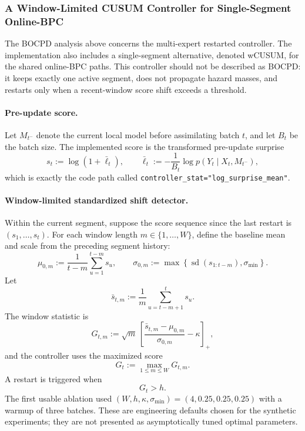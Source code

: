 \documentclass{article}
\begin{document}
\subsubsection{A Window-Limited CUSUM Controller for Single-Segment Online-BPC}
\label{sec:wcusum_controller}

The BOCPD analysis above concerns the multi-expert restarted controller. The implementation also includes a single-segment alternative, denoted wCUSUM, for the shared online-BPC paths. This controller should not be described as BOCPD: it keeps exactly one active segment, does not propagate hazard masses, and restarts only when a recent-window score shift exceeds a threshold.

\paragraph{Pre-update score.}
Let $M_{t^-}$ denote the current local model before assimilating batch $t$, and let $B_t$ be the batch size. The implemented score is the transformed pre-update surprise
\begin{equation}
s_t
:=
\log\!\left(
1 + \bar \ell_t
\right),
\qquad
\bar \ell_t
:=
-\frac{1}{B_t}\log p(Y_t \mid X_t, M_{t^-}),
\label{eq:wcusum_score}
\end{equation}
which is exactly the code path called \texttt{controller\_stat="log\_surprise\_mean"}.

\paragraph{Window-limited standardized shift detector.}
Within the current segment, suppose the score sequence since the last restart is $(s_1,\dots,s_t)$. For each window length $m \in \{1,\dots,W\}$, define the baseline mean and scale from the preceding segment history:
\begin{equation}
\mu_{0,m}
:=
\frac{1}{t-m}\sum_{u=1}^{t-m} s_u,
\qquad
\sigma_{0,m}
:=
\max\!\left\{
\operatorname{sd}(s_{1:t-m}),
\sigma_{\min}
\right\}.
\label{eq:wcusum_baseline}
\end{equation}
Let
\begin{equation}
\bar s_{t,m}
:=
\frac{1}{m}\sum_{u=t-m+1}^{t} s_u.
\end{equation}
The window statistic is
\begin{equation}
G_{t,m}
:=
\sqrt{m}\,
\left[
\frac{\bar s_{t,m}-\mu_{0,m}}{\sigma_{0,m}}
- \kappa
\right]_+,
\label{eq:wcusum_window_stat}
\end{equation}
and the controller uses the maximized score
\begin{equation}
G_t := \max_{1 \le m \le W} G_{t,m}.
\label{eq:wcusum_max_stat}
\end{equation}
A restart is triggered when
\begin{equation}
G_t > h.
\label{eq:wcusum_alarm_rule}
\end{equation}
The first usable ablation used $(W,h,\kappa,\sigma_{\min})=(4,0.25,0.25,0.25)$ with a warmup of three batches. These are engineering defaults chosen for the synthetic experiments; they are not presented as asymptotically tuned optimal parameters.
\end{document}

